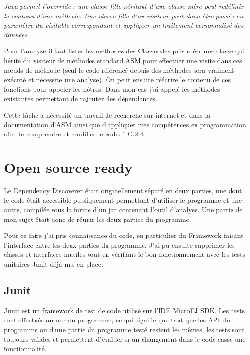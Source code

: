\documentclass[french,a4paper,12pt]{report}
\begin{document}
\textit{Java permet l'override : une classe fille héritant d'une classe mère peut redéfinir le contenu d'une méthode. Une classe fille d'un visiteur peut donc être passée en paramètre du visitable correspondant et appliquer un traitement personnalisé des données .}


\bigskip

Pour l'analyse il faut lister les méthodes des Classnodes puis créer une classe qui hérite du visiteur de méthodes standard ASM pour effectuer une visite dans ces nœuds de méthode (seul le code référencé depuis des méthodes sera vraiment exécuté et nécessite une analyse). On peut ensuite réécrire le contenu de ces fonctions pour appeler les nôtres. Dans mon cas j'ai appelé les méthodes existantes permettant de rajouter des dépendances.   

Cette tâche a nécessité un travail de recherche sur internet et dans la documentation d’ASM ainsi que d’appliquer mes compétences en programmation afin de comprendre et modifier le code. \hyperlink{competences}{TC.2.4}.

\section{Open source ready}

Le Dependency Discoverer était originellement séparé en deux parties, une dont le code était accessible publiquement permettant d'utiliser le programme et une autre, compilée sous la forme d'un jar contenant l'outil d'analyse. Une partie de mon sujet était donc de réunir les deux parties du programme.

Pour ce faire j'ai pris connaissance du code, en particulier du Framework faisant l'interface entre les deux parties du programme. J'ai pu ensuite supprimer les classes et interfaces inutiles tout en vérifiant le bon fonctionnement avec les tests unitaires Junit déjà mis en place.

\subsection{Junit}

Junit est un framework de test de code utilisé sur l’IDE MicroEJ SDK. Les tests sont effectués autour du programme, ce qui signifie que tant que les API du programme ou d'une partie du programme testé restent les mêmes, les tests sont toujours valides et permettent d’évaluer si un changement dans le code casse une fonctionnalité.
\end{document}
